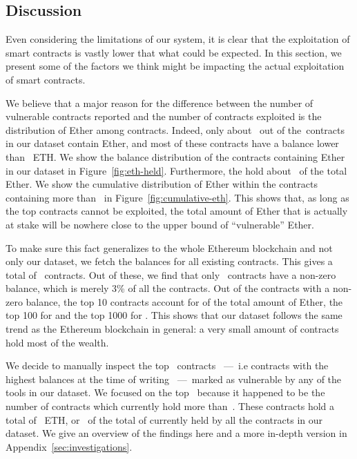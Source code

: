 \subsection{Discussion}
\label{sec:discussion}

Even considering the limitations of our system, it is clear that the exploitation of smart contracts is vastly lower that what could be expected. In this section, we present some of the factors we think might be impacting the actual exploitation of smart contracts.


We believe that a major reason for the difference between the number of vulnerable contracts reported and the number of contracts exploited is the distribution of Ether among contracts. Indeed, only about~ out of the~\VulnerableContracts contracts in our dataset contain Ether, and most of these contracts have a balance lower than~ ETH. We show the balance distribution of the contracts containing Ether in our dataset in Figure~\ref{fig:eth-held}. Furthermore, the  hold about~ of the total Ether. We show the cumulative distribution of Ether within the contracts containing more than~ in Figure~\ref{fig:cumulative-eth}. This shows that, as long as the top contracts cannot be exploited, the total amount of Ether that is actually at stake will be nowhere close to the upper bound of ``vulnerable'' Ether.

To make sure this fact generalizes to the whole Ethereum blockchain and not only our dataset, we fetch the balances for all existing contracts. This gives a total of~ contracts. Out of these, we find that only~ contracts have a non-zero balance, which is merely 3\% of all the contracts. Out of the contracts with a non-zero balance, the top 10 contracts account for  of the total amount of Ether, the top 100 for  and the top 1000 for . This shows that our dataset follows the same trend as the Ethereum blockchain in general: a very small amount of contracts hold most of the wealth.

We decide to manually inspect the top~ contracts~ ---~i.e contracts with the highest balances at the time of writing~ ---~marked as vulnerable by any of the tools in our dataset. We focused on the top~ because it happened to be the number of contracts which currently hold more than~. These contracts hold a total of~ ETH, or~ of the total of  currently held by all the contracts in our dataset. We give an overview of the findings here and a more in-depth version in Appendix~\ref{sec:investigations}.

